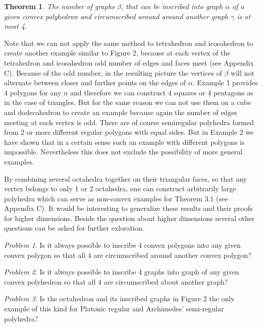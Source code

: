 \documentclass{birkjour}
\newtheorem{theorem}{Theorem}[section]
\theoremstyle{definition}
\theoremstyle{remark}
\newtheorem{problem}{Problem}
\numberwithin{equation}{section}
\begin{document}
\begin{theorem}
The number of graphs $\beta$, that can be inscribed into graph $\alpha$ of a given convex polyhedron and circumscribed around around another graph $\gamma$ is at most 4.
\end{theorem}

Note that we can not apply the same method to tetrahedron and icosahedron to create another example similar to Figure 2, because at each vertex of the tetrahedron and icosahedron odd number of edges and faces meet (see Appendix C). Because of the odd number, in the resulting picture the vertices of $\beta$ will not alternate between closer and farther points on the edges of $\alpha$. Example 1 provides 4 polygons for any $n$ and therefore we can construct 4 squares or 4 pentagons as in the case of triangles. But for the same reason we can not use them on a cube and dodecahedron to create an example because again the number of edges meeting at each vertex is odd. There are of course semiregular polyhedra formed from 2 or more different regular polygons with equal sides. But in Example 2 we have shown that in a certain sense such an example with different polygons is impossible. Nevertheless this does not exclude the possibility of more general examples.

By combining several octahedra together on their triangular faces, so that any vertex belongs to only 1 or 2 octahedra, one can construct arbitrarily large polyhedra which can serve as non-convex examples for Theorem 3.1 (see Appendix C). It would be interesting to generalize these results and their proofs for higher dimensions. Beside the question about higher dimensions several other questions can be asked for further exloration.
\begin{problem}
Is it always possible to inscribe 4 convex polygons into any given convex polygon so that all 4 are circumscribed around another convex polygon?
\end{problem}

\begin{problem}
Is it always possible to inscribe 4 graphs into graph of any given convex polyhedron so that all 4 are circumscribed about another graph?
\end{problem}

\begin{problem}
Is the octahedron and its inscribed graphs in Figure 2 the only example of this kind for Platonic regular and Archimedes' semi-regular polyhedra?
\end{problem}
\end{document}

